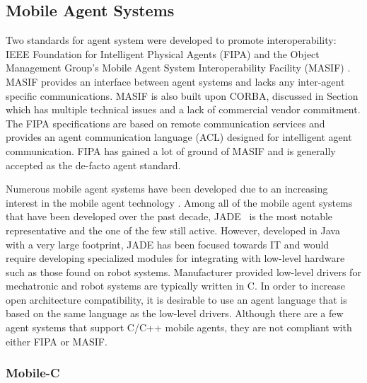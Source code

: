     \subsection{Mobile Agent Systems}
      Two standards for agent system were developed to promote interoperability:
        IEEE Foundation for Intelligent Physical Agents (FIPA) \cite{FIPA} and 
        the Object Management Group's Mobile Agent System Interoperability 
        Facility (MASIF) \cite{MASIF}.
      MASIF provides an interface between agent systems and lacks any 
        inter-agent specific communications.
      MASIF is also built upon CORBA, discussed in Section 
        \label{sec:middlewares} which has multiple technical issues and a
        lack of commercial vendor commitment.
      The FIPA specifications are based on remote communication services and
        provides an agent communication language (ACL) designed for intelligent 
        agent communication.
      FIPA has gained a lot of ground of MASIF and is generally accepted as the
        de-facto agent standard.

      Numerous mobile agent systems have been developed due to an increasing 
        interest in the mobile agent technology 
      \cite{Baumann,Lange,DWong,Gray,Peinethesis,Peine,Johnansen,jade_website}. 
      Among all of the mobile agent systems that have been developed over the past 
        decade, JADE~\cite{jade_website} is the most notable representative and 
        the one of the few still active.
      However, developed in Java with a very large footprint, JADE has been 
        focused towards IT and would require developing specialized modules for 
        integrating with low-level hardware such as those found on robot systems.
      Manufacturer provided low-level drivers for mechatronic and robot systems 
        are typically written in C. 
      In order to increase open architecture compatibility, it is desirable to use 
        an agent language that is based on the same language as the low-level 
        drivers. 
      Although there are a few agent systems that support C/C++ mobile agents, they 
        are not compliant with either FIPA or MASIF.

    \subsubsection{Mobile-C}

